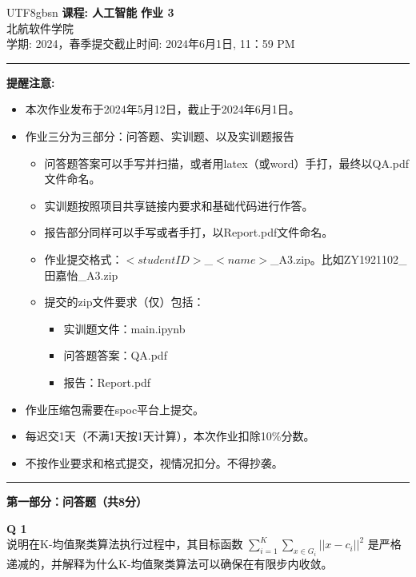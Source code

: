 \documentclass[a4paper, 11pt]{article}
\newenvironment{problem}[2][Q]
    { \begin{mdframed}[backgroundcolor=gray!20] \textbf{#1 #2} \\}
    {  \end{mdframed}}
\begin{document}
\begin{CJK}{UTF8}{gbsn}
\noindent
\large\textbf{课程: 人工智能} \hfill \textbf{作业 3}   \\
北航软件学院 \\
\normalsize 学期: 2024，春季\hfill 提交截止时间:  2024年6月1日, 11：59 PM \\
\noindent\rule{7in}{2.8pt}
\textbf{提醒注意:}
\begin{itemize}
\item 本次作业发布于2024年5月12日，截止于2024年6月1日。
\item 作业三分为三部分：问答题、实训题、以及实训题报告
\begin{itemize}
    \item 问答题答案可以手写并扫描，或者用latex（或word）手打，最终以QA.pdf文件命名。
    \item 实训题按照项目共享链接内要求和基础代码进行作答。
    \item 报告部分同样可以手写或者手打，以Report.pdf文件命名。
    \item 作业提交格式：$<student ID>$\_$<name>$\_A3.zip。比如ZY1921102\_田嘉怡\_A3.zip
    \item 提交的zip文件要求（仅）包括：
    \begin{itemize}
        \item 实训题文件：main.ipynb
        \item 问答题答案：QA.pdf
        \item 报告：Report.pdf
    \end{itemize}
    
\end{itemize}
\item 作业压缩包需要在spoc平台上提交。
\item 每迟交1天（不满1天按1天计算），本次作业扣除10\%分数。
\item 不按作业要求和格式提交，视情况扣分。不得抄袭。
\end{itemize}

\noindent\rule{7in}{1pt}
\textbf{第一部分：问答题（共8分）}


\begin{problem}{1}
说明在K-均值聚类算法执行过程中，其目标函数 $\sum_{i=1}^{K} \sum_{x\in G_i}||x-c_i||^2$ 是严格递减的，并解释为什么K-均值聚类算法可以确保在有限步内收敛。
\end{problem}


\end{CJK}
\end{document}
